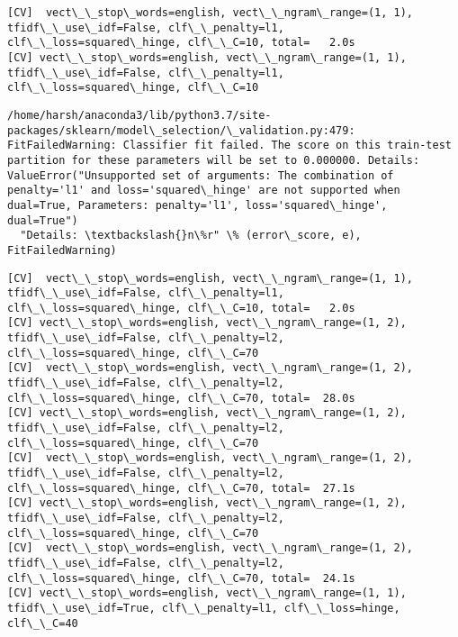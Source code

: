 \documentclass[11pt]{article}
\begin{document}
    \begin{Verbatim}[commandchars=\\\{\}]
[CV]  vect\_\_stop\_words=english, vect\_\_ngram\_range=(1, 1), tfidf\_\_use\_idf=False, clf\_\_penalty=l1, clf\_\_loss=squared\_hinge, clf\_\_C=10, total=   2.0s
[CV] vect\_\_stop\_words=english, vect\_\_ngram\_range=(1, 1), tfidf\_\_use\_idf=False, clf\_\_penalty=l1, clf\_\_loss=squared\_hinge, clf\_\_C=10 

    \end{Verbatim}

    \begin{Verbatim}[commandchars=\\\{\}]
/home/harsh/anaconda3/lib/python3.7/site-packages/sklearn/model\_selection/\_validation.py:479: FitFailedWarning: Classifier fit failed. The score on this train-test partition for these parameters will be set to 0.000000. Details: 
ValueError("Unsupported set of arguments: The combination of penalty='l1' and loss='squared\_hinge' are not supported when dual=True, Parameters: penalty='l1', loss='squared\_hinge', dual=True")
  "Details: \textbackslash{}n\%r" \% (error\_score, e), FitFailedWarning)

    \end{Verbatim}

    \begin{Verbatim}[commandchars=\\\{\}]
[CV]  vect\_\_stop\_words=english, vect\_\_ngram\_range=(1, 1), tfidf\_\_use\_idf=False, clf\_\_penalty=l1, clf\_\_loss=squared\_hinge, clf\_\_C=10, total=   2.0s
[CV] vect\_\_stop\_words=english, vect\_\_ngram\_range=(1, 2), tfidf\_\_use\_idf=False, clf\_\_penalty=l2, clf\_\_loss=squared\_hinge, clf\_\_C=70 
[CV]  vect\_\_stop\_words=english, vect\_\_ngram\_range=(1, 2), tfidf\_\_use\_idf=False, clf\_\_penalty=l2, clf\_\_loss=squared\_hinge, clf\_\_C=70, total=  28.0s
[CV] vect\_\_stop\_words=english, vect\_\_ngram\_range=(1, 2), tfidf\_\_use\_idf=False, clf\_\_penalty=l2, clf\_\_loss=squared\_hinge, clf\_\_C=70 
[CV]  vect\_\_stop\_words=english, vect\_\_ngram\_range=(1, 2), tfidf\_\_use\_idf=False, clf\_\_penalty=l2, clf\_\_loss=squared\_hinge, clf\_\_C=70, total=  27.1s
[CV] vect\_\_stop\_words=english, vect\_\_ngram\_range=(1, 2), tfidf\_\_use\_idf=False, clf\_\_penalty=l2, clf\_\_loss=squared\_hinge, clf\_\_C=70 
[CV]  vect\_\_stop\_words=english, vect\_\_ngram\_range=(1, 2), tfidf\_\_use\_idf=False, clf\_\_penalty=l2, clf\_\_loss=squared\_hinge, clf\_\_C=70, total=  24.1s
[CV] vect\_\_stop\_words=english, vect\_\_ngram\_range=(1, 1), tfidf\_\_use\_idf=True, clf\_\_penalty=l1, clf\_\_loss=hinge, clf\_\_C=40 

    \end{Verbatim}
\end{document}
